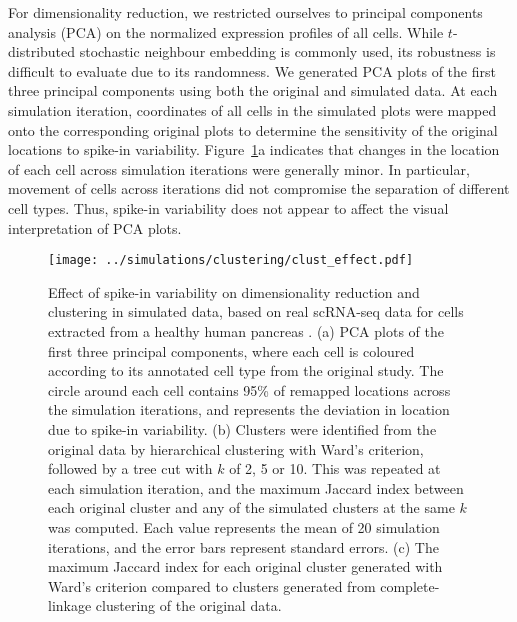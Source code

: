 \documentclass{article}
\begin{document}
For dimensionality reduction, we restricted ourselves to principal components analysis (PCA) on the normalized expression profiles of all cells. 
While $t$-distributed stochastic neighbour embedding \autocite{van2008visualizing} is commonly used, its robustness is difficult to evaluate due to its randomness.
We generated PCA plots of the first three principal components using both the original and simulated data.
At each simulation iteration, coordinates of all cells in the simulated plots were mapped onto the corresponding original plots to determine the sensitivity of the original locations to spike-in variability.
Figure~\ref{fig:dimclust}a indicates that changes in the location of each cell across simulation iterations were generally minor.
In particular, movement of cells across iterations did not compromise the separation of different cell types. 
Thus, spike-in variability does not appear to affect the visual interpretation of PCA plots.

\begin{figure}[btp]
    \begin{center}
        \texttt{[image: ../simulations/clustering/clust\_effect.pdf]}
    \end{center}
    \caption{Effect of spike-in variability on dimensionality reduction and clustering in simulated data,
        based on real scRNA-seq data for cells extracted from a healthy human pancreas \autocite{segerstople2016single}.
        (a) PCA plots of the first three principal components, where each cell is coloured according to its annotated cell type from the original study. 
        The circle around each cell contains 95\% of remapped locations across the simulation iterations, and represents the deviation in location due to spike-in variability.
        (b) Clusters were identified from the original data by hierarchical clustering with Ward's criterion, followed by a tree cut with $k$ of 2, 5 or 10.
        This was repeated at each simulation iteration, and the maximum Jaccard index between each original cluster and any of the simulated clusters at the same $k$ was computed.
        Each value represents the mean of 20 simulation iterations, and the error bars represent standard errors.
        (c) The maximum Jaccard index for each original cluster generated with Ward's criterion compared to clusters generated from complete-linkage clustering of the original data.
    }
    \label{fig:dimclust}
\end{figure}
\end{document}
